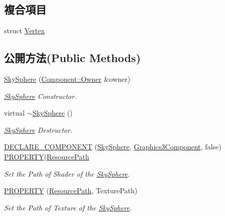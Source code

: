 \subsection*{複合項目}
\begin{DoxyCompactItemize}
\item 
struct \hyperlink{struct_magnum_1_1_sky_sphere_1_1_vertex}{Vertex}
\end{DoxyCompactItemize}
\subsection*{公開方法(Public Methods)}
\begin{DoxyCompactItemize}
\item 
\hyperlink{class_magnum_1_1_sky_sphere_a8e55896b6fb27e611be90451c67910a5}{Sky\+Sphere} (\hyperlink{class_magnum_1_1_component_1_1_owner}{Component\+::\+Owner} \&owner)
\begin{DoxyCompactList}\small\item\em \hyperlink{class_magnum_1_1_sky_sphere}{Sky\+Sphere} Constructor. \end{DoxyCompactList}\item 
virtual \hyperlink{class_magnum_1_1_sky_sphere_a4747bb606783031db88b2e622184e6d0}{$\sim$\+Sky\+Sphere} ()
\begin{DoxyCompactList}\small\item\em \hyperlink{class_magnum_1_1_sky_sphere}{Sky\+Sphere} Destructor. \end{DoxyCompactList}\item 
\hyperlink{class_magnum_1_1_sky_sphere_a09bfe98a60473fc0e85fea5f816fcb8b}{D\+E\+C\+L\+A\+R\+E\+\_\+\+C\+O\+M\+P\+O\+N\+E\+NT} (\hyperlink{class_magnum_1_1_sky_sphere}{Sky\+Sphere}, \hyperlink{class_magnum_1_1_graphics3_component}{Graphics3\+Component}, false)   \hyperlink{class_magnum_1_1_sky_sphere_a5a66403f2094a0501862275b9c27149b}{P\+R\+O\+P\+E\+R\+TY}(\hyperlink{class_magnum_1_1_resource_path}{Resource\+Path}
\begin{DoxyCompactList}\small\item\em Set the Path of Shader of the \hyperlink{class_magnum_1_1_sky_sphere}{Sky\+Sphere}. \end{DoxyCompactList}\item 
\hyperlink{class_magnum_1_1_sky_sphere_a5a66403f2094a0501862275b9c27149b}{P\+R\+O\+P\+E\+R\+TY} (\hyperlink{class_magnum_1_1_resource_path}{Resource\+Path}, Texture\+Path)
\begin{DoxyCompactList}\small\item\em Set the Path of Texture of the \hyperlink{class_magnum_1_1_sky_sphere}{Sky\+Sphere}. \end{DoxyCompactList}\end{DoxyCompactItemize}
